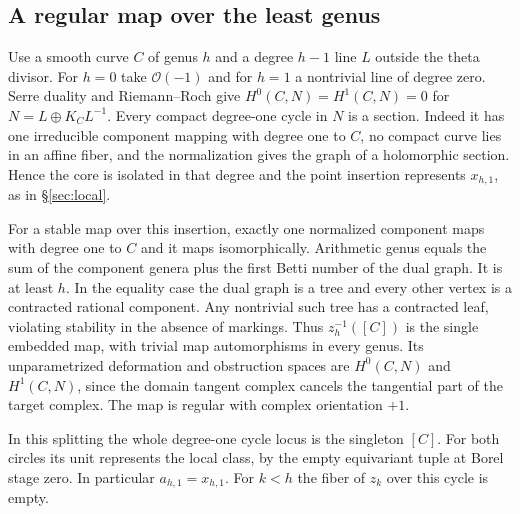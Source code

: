 \subsection{A regular map over the least genus}
Use a smooth curve $C$ of genus $h$ and a degree $h-1$ line $L$
outside the theta divisor. For $h=0$ take $\mathcal O(-1)$ and for
$h=1$ a nontrivial line of degree zero. Serre duality and
Riemann--Roch give $H^0(C,N)=H^1(C,N)=0$ for
$N=L\oplus K_C L^{-1}$. Every compact degree-one cycle in $N$ is a
section. Indeed it has one irreducible component mapping with degree
one to $C$, no compact curve lies in an affine fiber, and the
normalization gives the graph of a holomorphic section. Hence the
core is isolated in that degree and the point insertion represents
$x_{h,1}$, as in \S\ref{sec:local}.

For a stable map over this insertion, exactly one normalized
component maps with degree one to $C$ and it maps isomorphically.
Arithmetic genus equals the sum of the component genera plus the
first Betti number of the dual graph. It is at least $h$. In the
equality case the dual graph is a tree and every other vertex is a
contracted rational component. Any nontrivial such tree has a
contracted leaf, violating stability in the absence of markings.
Thus $z_h^{-1}([C])$ is the single embedded map, with trivial map
automorphisms in every genus. Its unparametrized deformation and
obstruction spaces are $H^0(C,N)$ and $H^1(C,N)$, since the
domain tangent complex cancels the tangential part of the target
complex. The map is regular with complex orientation $+1$.

In this splitting the whole degree-one cycle locus is the singleton
$[C]$. For both circles its unit represents the local class, by the
empty equivariant tuple at Borel stage zero. In particular
$a_{h,1}=x_{h,1}$. For $k<h$ the fiber of $z_k$ over this cycle is empty.


